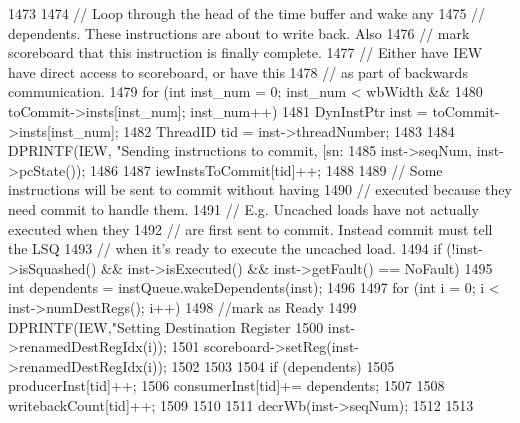 \begin{DoxyCode}
1473 {
1474     // Loop through the head of the time buffer and wake any
1475     // dependents.  These instructions are about to write back.  Also
1476     // mark scoreboard that this instruction is finally complete.
1477     // Either have IEW have direct access to scoreboard, or have this
1478     // as part of backwards communication.
1479     for (int inst_num = 0; inst_num < wbWidth &&
1480              toCommit->insts[inst_num]; inst_num++) {
1481         DynInstPtr inst = toCommit->insts[inst_num];
1482         ThreadID tid = inst->threadNumber;
1483 
1484         DPRINTF(IEW, "Sending instructions to commit, [sn:%
1485                 inst->seqNum, inst->pcState());
1486 
1487         iewInstsToCommit[tid]++;
1488 
1489         // Some instructions will be sent to commit without having
1490         // executed because they need commit to handle them.
1491         // E.g. Uncached loads have not actually executed when they
1492         // are first sent to commit.  Instead commit must tell the LSQ
1493         // when it's ready to execute the uncached load.
1494         if (!inst->isSquashed() && inst->isExecuted() && inst->getFault() == 
      NoFault) {
1495             int dependents = instQueue.wakeDependents(inst);
1496 
1497             for (int i = 0; i < inst->numDestRegs(); i++) {
1498                 //mark as Ready
1499                 DPRINTF(IEW,"Setting Destination Register %
1500                         inst->renamedDestRegIdx(i));
1501                 scoreboard->setReg(inst->renamedDestRegIdx(i));
1502             }
1503 
1504             if (dependents) {
1505                 producerInst[tid]++;
1506                 consumerInst[tid]+= dependents;
1507             }
1508             writebackCount[tid]++;
1509         }
1510 
1511         decrWb(inst->seqNum);
1512     }
1513 }
\end{DoxyCode}


